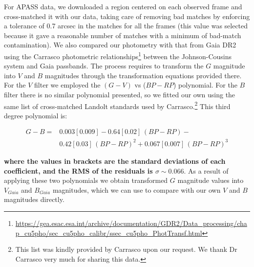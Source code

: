 \documentclass[draft]{aa}
\begin{document}
For APASS data, we downloaded a region centered on each
observed frame and cross-matched it with our data, taking care of removing
bad matches by enforcing a tolerance of 0.7 arcsec in the matches for all the
frames (this value was selected because it gave a reasonable number of
matches with a minimum of bad-match contamination).
%
We also compared our photometry with that from Gaia DR2 using the
Carrasco photometric
relationships\footnote{\url{https://gea.esac.esa.int/archive/documentation/GDR2/Data_processing/chap_cu5pho/sec_cu5pho_calibr/ssec_cu5pho_PhotTransf.html}}
between the Johnson-Cousins system and Gaia passbands. The process
requires to transform the $G$ magnitude into $V$ and $B$ magnitudes through the
transformation equations provided there. For the $V$ filter we employed the
$(G-V)$ vs ($BP-RP$) polynomial. For the $B$ filter there is no similar
polynomial presented, so we fitted our own using the same list of
cross-matched Landolt standards used by Carrasco.\footnote{This list was kindly
provided by Carrasco upon our request. We thank Dr Carrasco very much for
sharing this data.} This third degree polynomial is:

\begin{equation}
\begin{aligned}
G - B = {} & 0.003[0.009]-0.64[0.02]\,(BP-RP)- \\
        & 0.42[0.03]\,(BP-RP)^2+0.067[0.007]\,(BP-RP)^3
\end{aligned}
\end{equation}

\noindent
\textbf{where the values in brackets are the standard deviations of each
coefficient, and the RMS of the residuals is $\sigma\sim0.066$}.
As a result of applying these two polynomials we obtain transformed $G$
magnitude values into $V_{Gaia}$ and $B_{Gaia}$ magnitudes, which we can use to
compare with our own $V$ and $B$ magnitudes directly.
\end{document}
